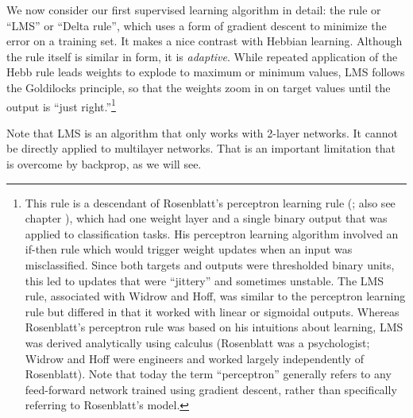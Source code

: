 We now consider our first supervised learning algorithm in detail: the  rule or ``LMS'' or ``Delta rule'', which uses a form of gradient descent to minimize the error on a training set. It makes a nice contrast with Hebbian learning. Although the rule itself is similar in form, it is \emph{adaptive}.  While repeated application of the Hebb rule leads weights to explode to maximum or minimum values, LMS follows the Goldilocks principle, so that the weights zoom in on target values until the output is ``just right.''\footnote{This rule is a descendant of Rosenblatt's perceptron learning rule (\cite{rosenblatt1960perceptron}; also see chapter ), which had one weight layer and a single binary output that was applied to classification tasks.  His perceptron learning algorithm involved an if-then rule which would trigger weight updates when an input was misclassified. Since both targets and outputs were thresholded binary units, this led to updates that were ``jittery'' and sometimes unstable. The LMS rule, associated with Widrow and Hoff, was similar to the perceptron learning rule but differed in that it worked with linear or sigmoidal outputs. Whereas Rosenblatt’s perceptron rule was based on his intuitions about learning, LMS was derived analytically using calculus (Rosenblatt was a psychologist; Widrow and Hoff were engineers and worked largely independently of Rosenblatt). Note that today the term ``perceptron'' generally refers to any feed-forward network trained using gradient descent, rather than specifically referring to Rosenblatt's model. }

Note that LMS is an algorithm that only works with 2-layer networks. It cannot be directly applied to multilayer networks. That is an important limitation that is overcome by backprop, as we will see.

